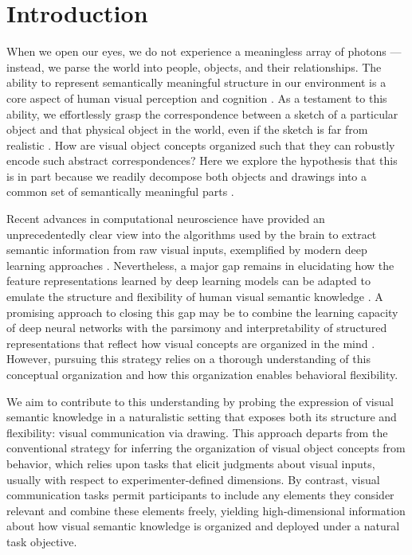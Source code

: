 \documentclass[10pt,letterpaper]{article}
\begin{document}
\section{Introduction}


When we open our eyes, we do not experience a meaningless array of photons --- instead, we parse the world into people, objects, and their relationships. 
The ability to represent semantically meaningful structure in our environment is a core aspect of human visual perception and cognition \cite{navon1977forest}. 
As a testament to this ability, we effortlessly grasp the correspondence between a sketch of a particular object and that physical object in the world, even if the sketch is far from realistic \cite{eitz2012humans}. 
How are visual object concepts organized such that they can robustly encode such abstract correspondences?
Here we explore the hypothesis that this is in part because we readily decompose both objects and drawings into a common set of semantically meaningful parts \cite{biederman1988surface}. 

Recent advances in computational neuroscience have provided an unprecedentedly clear view into the algorithms used by the brain to extract semantic information from raw visual inputs, exemplified by modern deep learning approaches \cite{yamins2014performance}.
Nevertheless, a major gap remains in elucidating how the feature representations learned by deep learning models can be adapted to emulate the structure and flexibility of human visual semantic knowledge \cite{lake2017building}.
A promising approach to closing this gap may be to combine the learning capacity of deep neural networks with the parsimony and interpretability of structured representations that reflect how visual concepts are organized in the mind \cite{battaglia2018relational}. 
However, pursuing this strategy relies on a thorough understanding of this conceptual organization and how this organization enables behavioral flexibility.  

We aim to contribute to this understanding by probing the expression of visual semantic knowledge in a naturalistic setting that exposes both its structure and flexibility: visual communication via drawing. 
This approach departs from the conventional strategy for inferring the organization of visual object concepts from behavior, which relies upon tasks that elicit judgments about visual inputs, usually with respect to experimenter-defined dimensions. 
By contrast, visual communication tasks permit participants to include any elements they consider relevant and combine these elements freely, yielding high-dimensional information about how visual semantic knowledge is organized and deployed under a natural task objective. 
\end{document}
